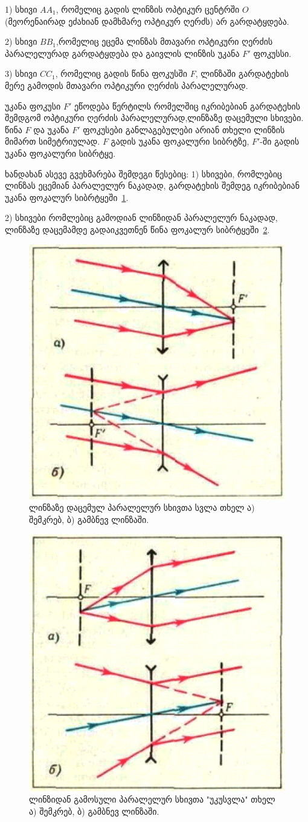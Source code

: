 \documentclass[a4paper]{book}
\begin{document}
1) სხივი $AA_1$, რომელიც გადის ლინზის ოპტიკურ ცენტრში $O$ (მეორენაირად ეძახიან დამხმარე ოპტიკურ ღერძს) არ გარდატყდება.

2) სხივი $BB_1$,რომელიც ეცემა ლინზას მთავარი ოპტიკური ღერძის პარალელურად გარდატყდება და გაივლის ლინზის უკანა $F'$ ფოკუსსი.

3) სხივი $CC_1$, რომელიც გადის წინა ფოკუსში $F$, ლინზაში გარდატეხის მერე გამოდის მთავარი ოპტიკური ღერძის პარალელურად.

უკანა ფოკუსი $F'$ ეწოდება წერტილს რომელშიც იკრიბებიან გარდატეხის შემდგომ ოპტიკური ღერძის პარალელურად,ლინზაზე დაცემული სხივები. წინა $F$ და უკანა $F'$ ფოკუსები განლაგებულები არიან თხელი ლინზის მიმართ სიმეტრიულად. $F$ გადის უკანა ფოკალური სიბრტზე, $F'$-ში გადის უკანა ფოკალური სიბრტყე.

ხანდახან ასევე გვეხმარება შემდეგი წესებიც:
1) სხივები, რომლებიც ლინზას ეცემიან პარალელურ ნაკადად, გარდატეხის შემდეგ იკრიბებიან უკანა ფოკალურ სიბრტყეში~\ref{fig:optics_2}.

2) სხივები რომლებიც გამოდიან ლინზიდან პარალელურ ნაკადად, ლინზაზე დაცემამდე გადაიკვეთნენ წინა ფოკალურ სიბრტყეში~\ref{fig:optics_3}. 

		\begin{figure}[h]
		   \centering
           \includegraphics[width=0.5\columnwidth]{figures/optics_2}
           \caption{ლინზაზე დაცემულ პარალელურ სხივთა სვლა თხელ ა) შემკრებ, ბ) გამბნევ ლინზაში.}
           \label{fig:optics_2}
        \end{figure}

		\begin{figure}[h]
		   \centering
           \includegraphics[width=0.5\columnwidth]{figures/optics_3}
           \caption{ლინზიდან გამოსული პარალელურ სხივთა "უკუსვლა" თხელ ა) შემკრებ, ბ) გამბნევ ლინზაში.}
           \label{fig:optics_3}
        \end{figure}
\end{document}
